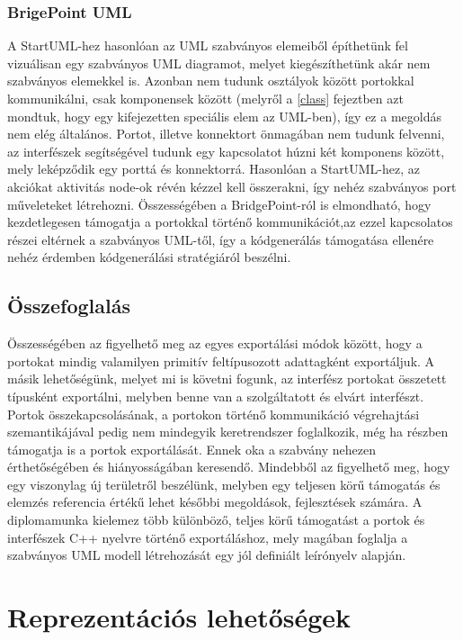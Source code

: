\documentclass[a4paper,12pt]{report}
\begin{document}
\subsection{BrigePoint UML}
A StartUML-hez hasonlóan az UML szabványos elemeiből építhetünk fel vizuálisan egy szabványos UML diagramot, melyet kiegészíthetünk akár nem szabványos elemekkel is. Azonban nem tudunk osztályok között portokkal kommunikálni, csak komponensek között (melyről a \ref{class} fejeztben azt mondtuk, hogy egy kifejezetten speciális elem az UML-ben), így ez a megoldás nem elég általános. Portot, illetve konnektort önmagában nem tudunk felvenni, az interfészek segítségével tudunk egy kapcsolatot húzni két komponens között, mely leképződik egy porttá és konnektorrá. Hasonlóan a StartUML-hez, az akciókat aktivitás node-ok révén kézzel kell összerakni, így nehéz szabványos port műveleteket létrehozni. Összességében a BridgePoint-ról \cite{bridge} is elmondható, hogy kezdetlegesen támogatja a portokkal történő kommunikációt,az ezzel kapcsolatos részei eltérnek a szabványos UML-től, így a kódgenerálás támogatása ellenére nehéz érdemben kódgenerálási stratégiáról beszélni. 

\section{Összefoglalás}
Összességében az figyelhető meg az egyes exportálási módok között, hogy a portokat mindig valamilyen primitív feltípusozott adattagként exportáljuk. A másik lehetőségünk, melyet mi is követni fogunk, az interfész portokat összetett típusként exportálni, melyben benne van a szolgáltatott és elvárt interfészt. Portok összekapcsolásának, a portokon történő kommunikáció végrehajtási szemantikájával pedig nem mindegyik keretrendszer foglalkozik, még ha részben támogatja is a portok exportálását. Ennek oka a szabvány nehezen érthetőségében és hiányosságában keresendő. Mindebből az figyelhető meg, hogy egy viszonylag új területről beszélünk, melyben egy teljesen körű támogatás és elemzés referencia értékű lehet későbbi megoldások, fejlesztések számára. A diplomamunka kielemez több különböző, teljes körű támogatást a portok és interfészek C++ nyelvre történő exportáláshoz, mely magában foglalja a szabványos UML modell létrehozását egy jól definiált leírónyelv alapján.

\chapter{Reprezentációs lehetőségek} \label{reprezentation}
\end{document}
